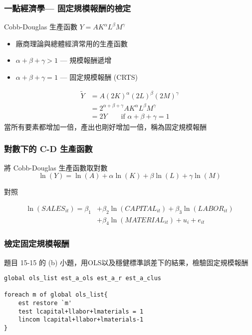 \begin{frame}
    \frametitle{一點經濟學--- 固定規模報酬的檢定}

    Cobb-Douglas 生產函數 $Y=A K^{\alpha} L^{\beta} M^{\gamma}$
    \begin{itemize}
        \item 廠商理論與總體經濟常用的生產函數
        \item $\alpha + \beta + \gamma > 1$ --- 規模報酬遞增
        \item $\alpha + \beta + \gamma = 1$ --- 固定規模報酬 (CRTS)
    \end{itemize} 

    \begin{align*}
        \tilde{Y} &= A(2K)^{\alpha} (2L)^{\beta} (2M)^{\gamma} \\
        &= 2^{\alpha + \beta + \gamma} A K^{\alpha} L^{\beta} M^{\gamma}\\
        &= 2 Y \qquad \text{if } \alpha + \beta + \gamma = 1
    \end{align*}
    當所有要素都增加一倍，產出也剛好增加一倍，稱為固定規模報酬


\end{frame}

\begin{frame}
    \frametitle{對數下的 C-D 生產函數}
    將 Cobb-Douglas 生產函數取對數
    \begin{equation*}
        \ln(Y) = \ln(A) + \alpha \ln(K) + \beta \ln(L) + \gamma \ln(M)
    \end{equation*}

    對照

    \begin{align*}
        \ln(SALES_{it}) = \beta_1 &+ \beta_2 \ln(CAPITAL_{it})
        + \beta_3 \ln(LABOR_{it}) \\
        & + \beta_4 \ln(MATERIAL_{it}) 
        + u_i + e_{it}
    \end{align*}

\end{frame}

\begin{frame}[fragile]
    \frametitle{檢定固定規模報酬}

    題目 15-15 的 (b) 小題，用OLS以及穩健標準誤差下的結果，檢驗固定規模報酬

\begin{lstlisting}
global ols_list est_a_ols est_a_r est_a_clus

foreach m of global ols_list{
    est restore `m'
    test lcapital+llabor+lmaterials = 1
    lincom lcapital+llabor+lmaterials-1
}\end{lstlisting}

\end{frame}

